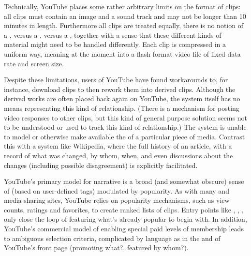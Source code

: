 {\page


Technically, YouTube places some rather arbitrary limits on the format
of clips: all clips must contain an image and a sound track and may not
be longer than 10 minutes in length. Furthermore all clips are treated
equally, there is no notion of a
, versus a
, versus a
, together with a sense
that these different kinds of material might need to be handled
differently. Each clip is compressed in a uniform way, meaning at the
moment into a flash format video file of fixed data rate and screen
size.


Despite these limitations, users of YouTube have found workarounds to,
for instance, download clips to then rework them into derived clips.
Although the derived works are often placed back again on YouTube, the
system itself has no means representing this kind of relationship.
(There is a mechanism for posting video responses to other clips, but
this kind of general purpose solution seems not to be understood or
used to track this kind of 
relationship.) The system is unable to model or otherwise make
available the  of a
particular piece of media. Contrast this with a system like Wikipedia,
where the full history of an article, with a record of what was
changed, by whom, when, and even
 discussions about the
changes (including possible disagreement) is explicitly facilitated.


YouTube's primary model for narrative is a broad (and
somewhat obscure) sense of
 (based on
user{}-defined tags) modulated by popularity. As with many
 and media sharing
sites, YouTube relies on  popularity mechanisms, such as view counts,
 ratings and favorites, to
create ranked lists of clips. Entry points like
,
, , only close the loop of featuring
what's already popular to begin with. In addition,
YouTube's commercial model of enabling special paid
levels of membership leads to ambiguous selection criteria, complicated
by language as in the  and  of YouTube's front page
(promoting what?, featured by whom?).

}
